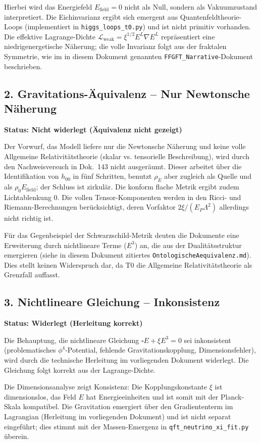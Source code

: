 Hierbei wird das Energiefeld \(E_{\text{field}} = 0\) nicht als Null, sondern als Vakuumzustand interpretiert. Die Eichinvarianz ergibt sich emergent aus Quantenfeldtheorie-Loops (implementiert in \texttt{higgs\_loops\_t0.py}) und ist nicht primitiv vorhanden. Die effektive Lagrange-Dichte \(\mathcal{L}_{\text{weak}} = \xi^{1/2} E^L \nabla E^L\) repräsentiert eine niedrigenergetische Näherung; die volle Invarianz folgt aus der fraktalen Symmetrie, wie im in diesem Dokument genannten \texttt{FFGFT\_Narrative}-Dokument beschrieben.

\subsection{2. Gravitations-Äquivalenz – Nur Newtonsche Näherung}
\textbf{Status: Nicht widerlegt (Äquivalenz nicht gezeigt)}
	
	Der Vorwurf, das Modell liefere nur die Newtonsche Näherung und keine volle Allgemeine Relativitätstheorie (skalar vs. tensorielle Beschreibung), wird durch den Nachweisversuch in Dok.~143 nicht ausgeräumt. Dieser arbeitet über die Identifikation von \(h_{00}\) in fünf Schritten, benutzt \(\rho_E\) aber zugleich als Quelle und als \(\rho_0 E_{\text{field}}\); der Schluss ist zirkulär. Die konform flache Metrik ergibt zudem Lichtablenkung $0$. Die vollen Tensor-Komponenten werden in den Ricci- und Riemann-Berechnungen berücksichtigt, deren Vorfaktor $2\xi/(E_P\Lambda^2)$ allerdings nicht richtig ist.

Für das Gegenbeispiel der Schwarzschild-Metrik deuten die Dokumente eine Erweiterung durch nichtlineare Terme (\(E^3\)) an, die aus der Dualitätsstruktur emergieren (siehe in diesem Dokument zitiertes \texttt{OntologischeAequivalenz.md}). Dies stellt keinen Widerspruch dar, da T0 die Allgemeine Relativitätstheorie als Grenzfall auffasst.

\subsection{3. Nichtlineare Gleichung – Inkonsistenz}
\textbf{Status: Widerlegt (Herleitung korrekt)}

Die Behauptung, die nichtlineare Gleichung \(\square E + \xi E^3 = 0\) sei inkonsistent (problematisches \(\phi^4\)-Potential, fehlende Gravitationskopplung, Dimensionsfehler), wird durch die technische Herleitung im vorliegenden Dokument widerlegt. Die Gleichung folgt korrekt aus der Lagrange-Dichte.

Die Dimensionsanalyse zeigt Konsistenz: Die Kopplungskonstante \(\xi\) ist dimensionslos, das Feld \(E\) hat Energieeinheiten und ist somit mit der Planck-Skala kompatibel. Die Gravitation emergiert über den Gradiententerm im Lagrangian (Herleitung im vorliegenden Dokument) und ist nicht separat eingeführt; dies stimmt mit der Massen-Emergenz in \texttt{qft\_neutrino\_xi\_fit.py} überein.

